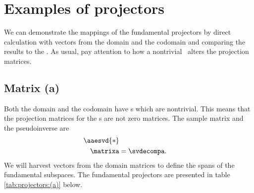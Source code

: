 \section{Examples of projectors}
We can demonstrate the mappings of the fundamental projectors by direct calculation with vectors from the domain and the codomain and comparing the results to the \asvd. As usual, pay attention to how a nontrivial \ns \ alters the projection matrices.

\subsection{Matrix (a)}
Both the domain and the codomain have \ns s which are nontrivial. This means that the projection matrices for the \ns s are not zero matrices.
The sample matrix and the pseudoinverse are
\begin{equation*}
  \begin{split}
    \aaesvd{*} \\
    \matrixa &= \svdecompa.   
  \end{split}
\end{equation*}
We will harvest vectors from the domain matrices to define the spans of the fundamental subspaces. The fundamental projectors are presented in table \eqref{tab:projectors:(a)} below. 

